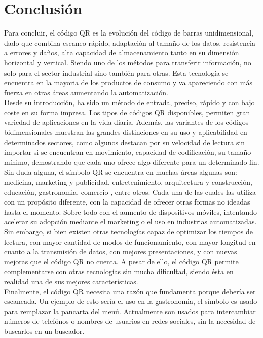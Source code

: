\section{Conclusión}
Para concluir, el código QR es la evolución del código de barras unidimensional, dado que combina escaneo rápido, adaptación al tamaño de los datos, resistencia a errores y daños, alta capacidad de almacenamiento tanto en su dimensión horizontal y vertical. Siendo uno de los métodos para transferir información, no solo para el sector industrial sino también para otras. Esta tecnología se encuentra en la mayoria de los productos de consumo y va apareciendo con más fuerza en otras áreas aumentando la automatización.
\\
Desde su introducción, ha sido un método de entrada, preciso, rápido y con bajo coste en su forma impresa. Los tipos de códigos QR disponibles, permiten gran variedad de aplicaciones en la vida diaria.  Además, las variantes de los códigos bidimensionales muestran las grandes distinciones en su uso y aplicabilidad en determinados sectores, como algunos destacan por su velocidad de lectura sin importar si se encuentran en movimiento, capacidad de codificación, su tamaño mínimo, demostrando que cada uno ofrece algo diferente para un determinado fin.
\\
Sin duda alguna, el símbolo QR se encuentra en muchas áreas algunas son: medicina, marketing y publicidad, entretenimiento, arquitectura y construcción, educación, gastronomia, comercio , entre otros. Cada una de las cuales las utiliza con un propósito diferente, con la capacidad de ofrecer otras formas no ideadas hasta el momento. Sobre todo con el aumento de dispositivos móviles, intentando acelerar su adopción mediante el marketing o el uso en industrias automatizadas.
\\
Sin embargo, si bien existen otras tecnologías capaz de optimizar los tiempos de lectura, con mayor cantidad de modos de funcionamiento, con mayor longitud en cuanto a la transmisión de datos, con mejores presentaciones, y con nuevas mejoras que el código QR no cuenta. A pesar de ello, el código QR permite complementarse con otras tecnologías sin mucha dificultad, siendo ésta en realidad una de sus mejores características.
\\
Finalmente, el código QR necesita una razón que fundamenta porque debería ser escaneada. Un ejemplo de esto sería el uso en la gastronomia, el símbolo es usado para remplazar la pancarta del menú. Actualmente son usados para intercambiar números de telefónos o nombres de usuarios en redes sociales, sin la necesidad de buscarlos en un buscador.
